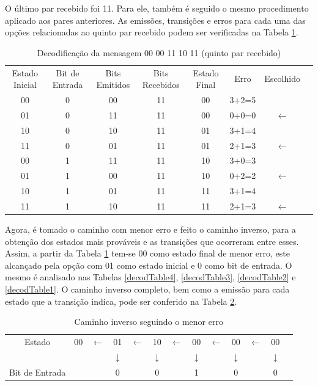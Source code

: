 \documentclass[12pt]{article}
\begin{document}
O último par recebido foi 11. Para ele, também é seguido o mesmo procedimento aplicado aos pares anteriores. As emissões, transições e erros para cada uma das opções relacionadas ao quinto par recebido podem ser verificadas na Tabela \ref{decodTable5}.

\begin{table}[!ht]
\centering
\caption{Decodificação da mensagem 00 00 11 10 11 (quinto par recebido)}
\label{decodTable5}
\def\arraystretch{1.2}
\begin{tabular}{cccccccc}
\multirow{2}{3.6em}{Estado Inicial} & \multirow{2}{3.6em}{Bit de Entrada} &  \multirow{2}{3.6em}{Bits Emitidos} & \multirow{2}{3.6em}{Bits Recebidos} & \multirow{2}{3.6em}{Estado Final} & \multirow{2}{3.6em}{Erro} &
\multirow{2}{3.6em}{Escolhido}\\&&&&&&\\ \hline
 00 & 0 & 00 & 11 & 00 & 3+2=5 &\\
 01 & 0 & 11 & 11 & 00 & 0+0=0 & $\longleftarrow$\\
 10 & 0 & 10 & 11 & 01 & 3+1=4 &\\
 11 & 0 & 01 & 11 & 01 & 2+1=3 & $\longleftarrow$\\
 00 & 1 & 11 & 11 & 10 & 3+0=3 &\\
 01 & 1 & 00 & 11 & 10 & 0+2=2 & $\longleftarrow$\\
 10 & 1 & 01 & 11 & 11 & 3+1=4 &\\
 11 & 1 & 10 & 11 & 11 & 2+1=3 & $\longleftarrow$\\\hline
\end{tabular}
\end{table}

Agora, é tomado o caminho com menor erro e feito o caminho inverso, para a obtenção dos estados mais prováveis e as transições que ocorreram entre esses. Assim, a partir da Tabela \ref{decodTable5} tem-se 00 como estado final de menor erro, este alcançado pela opção com 01 como estado inicial e 0 como bit de entrada. O mesmo é analisado nas Tabelas \ref{decodTable4}, \ref{decodTable3}, \ref{decodTable2} e \ref{decodTable1}. O caminho inverso completo, bem como a emissão para cada estado que a transição indica, pode ser conferido na Tabela \ref{return}.

\begin{table}[!ht]
\centering
\caption{Caminho inverso seguindo o menor erro}
\label{return}
\def\arraystretch{1.2}
\begin{tabular}{ccccccccccccc}
Estado & 00 & $\longleftarrow$ & 01 & $\longleftarrow$ & 10 & $\longleftarrow$ & 00 & $\longleftarrow$ & 00 & $\longleftarrow$ & 00\\
&&& $\downarrow$ && $\downarrow$ && $\downarrow$ && $\downarrow$ && $\downarrow$\\
Bit de Entrada &&& 0 & & 0 & & 1 & & 0 & & 0\\
\end{tabular}
\end{table}
\end{document}
